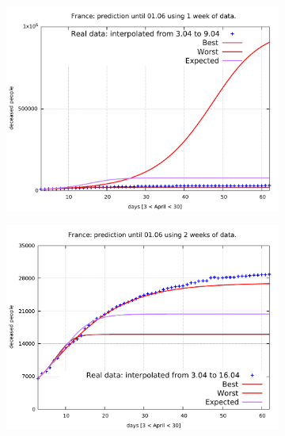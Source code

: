 \documentclass[8pt]{article}
\begin{document}
\begin{figure}[h!]
  \centering
  \begin{subfigure}[b]{0.45\linewidth}
  \includegraphics[width=\linewidth]{../err10p_simulations/fr/3-9/3-9.pdf}
  \end{subfigure}
  \begin{subfigure}[b]{0.45\linewidth}
    \includegraphics[width=\linewidth]{../err10p_simulations/fr/3-16/3-16.pdf}
  \end{subfigure}
  \begin{subfigure}[b]{0.45\linewidth}

\end{subfigure}
\end{figure}
\end{document}

